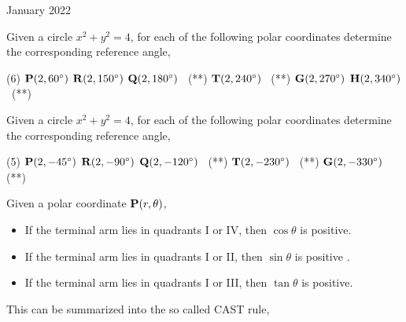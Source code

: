 \documentclass[12pt,oneside]{book} %
\newcounter{Rule}[section]
\begin{document}
\begin{lec}{January 2022}
   \begin{ex}
     Given a circle $x^2 + y^2 = 4$, for each of the following polar coordinates determine the corresponding
     reference angle,
    \begin{tasks}(6)
       \task $\vb P(2, 60^{\circ})$
       \task $\vb R(2, 150^{\circ})$
       \task $\vb Q(2, 180^{\circ})$ \, (**)
       \task $\vb T(2, 240^{\circ})$ \, (**)
       \task $\vb G(2, 270^{\circ})$
       \task $\vb H(2, 340^{\circ})$ \, (**)
    \end{tasks}

   \end{ex}

   \begin{ex}
     Given a circle $x^2 + y^2 = 4$, for each of the following polar coordinates determine the corresponding
     reference angle,
    \begin{tasks}(5)
       \task $\vb P(2, -45^{\circ})$
       \task $\vb R(2, -90^{\circ})$
       \task $\vb Q(2, -120^{\circ})$ \, (**)
       \task $\vb T(2, -230^{\circ})$ \, (**)
       \task $\vb G(2, -330^{\circ})$ \, (**)
    \end{tasks}

   \end{ex}

   \newpage

   \begin{thrm}
     Given a polar coordinate $\vb P(r,\theta)$,
     \begin{itemize}
       \item If the terminal arm lies in quadrants  I or IV, then $\cos \theta$ is positive.
       \item If the terminal arm lies in quadrants  I or II, then $\sin \theta$ is positive .
       \item If the terminal arm lies in quadrants  I or III, then $\tan \theta$ is positive.
     \end{itemize}
     This can be summarized into the so called CAST rule,

         \begin{center}
\end{center}
\end{thrm}
\end{lec}
\end{document}
